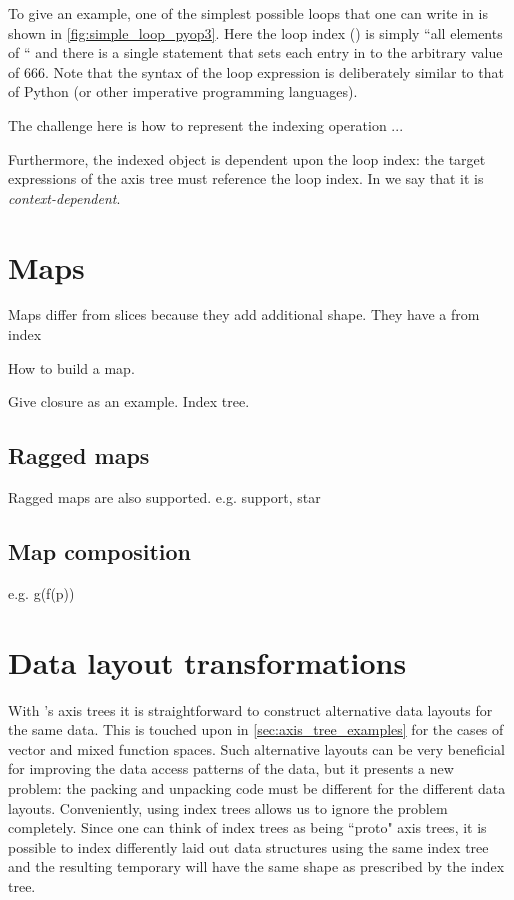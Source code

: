 \documentclass[thesis]{subfiles}
\begin{document}
To give an example, one of the simplest possible loops that one can write in  is shown in \cref{fig:simple_loop_pyop3}.
Here the loop index () is simply ``all elements of `` and there is a single statement that sets each entry in  to the arbitrary value of 666.
Note that the syntax of the loop expression is deliberately similar to that of Python (or other imperative programming languages).

The challenge here is how to represent the indexing operation ...


Furthermore, the indexed object is dependent upon the loop index: the target expressions of the axis tree must reference the loop index.
In  we say that it is \textit{context-dependent}.



\section{Maps}

Maps differ from slices because they add additional shape. They have a from index

How to build a map.

Give closure as an example. Index tree.

\subsection{Ragged maps}

Ragged maps are also supported. e.g. support, star

\subsection{Map composition}

e.g. g(f(p))

\section{Data layout transformations}

With 's axis trees it is straightforward to construct alternative data layouts for the same data.
This is touched upon in \cref{sec:axis_tree_examples} for the cases of vector and mixed function spaces.
Such alternative layouts can be very beneficial for improving the data access patterns of the data, but it presents a new problem: the packing and unpacking code must be different for the different data layouts.
Conveniently, using index trees allows us to ignore the problem completely.
Since one can think of index trees as being ``proto" axis trees, it is possible to index differently laid out data structures using the same index tree and the resulting temporary will have the same shape as prescribed by the index tree.
\end{document}
